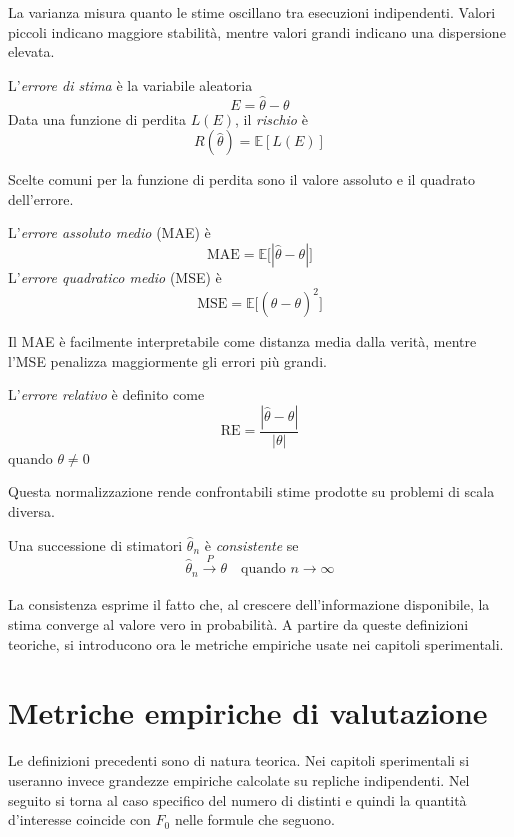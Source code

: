 La varianza misura quanto le stime oscillano tra esecuzioni indipendenti.
Valori piccoli indicano maggiore stabilità, mentre valori grandi indicano una dispersione elevata.

\begin{definition}
L'\emph{errore di stima} è la variabile aleatoria
\[
E = \hat{\theta} - \theta
\]
Data una funzione di perdita $L(E)$, il \emph{rischio} è
\[
R(\hat{\theta}) = \mathbb{E}[L(E)]
\]
\end{definition}

Scelte comuni per la funzione di perdita sono il valore assoluto e il quadrato dell'errore.

\begin{definition}
L'\emph{errore assoluto medio} (MAE) è
\[
\mathrm{MAE} = \mathbb{E}\bigl[|\hat{\theta}-\theta|\bigr]
\]
L'\emph{errore quadratico medio} (MSE) è
\[
\mathrm{MSE} = \mathbb{E}\bigl[(\hat{\theta}-\theta)^2\bigr]
\]
\end{definition}

Il MAE è facilmente interpretabile come distanza media dalla verità, mentre l'MSE penalizza maggiormente gli errori più grandi.

\begin{definition}
L'\emph{errore relativo} è definito come
\[
\mathrm{RE} = \frac{|\hat{\theta}-\theta|}{|\theta|}
\]
quando $\theta \neq 0$
\end{definition}

Questa normalizzazione rende confrontabili stime prodotte su problemi di scala diversa.

\begin{definition}[Consistenza]
Una successione di stimatori $\hat{\theta}_n$ è \emph{consistente} se
\[
\hat{\theta}_n \xrightarrow[]{P} \theta
\quad \text{quando } n \to \infty
\]
\end{definition}

La consistenza esprime il fatto che, al crescere dell'informazione disponibile,
la stima converge al valore vero in probabilità. A partire da queste definizioni teoriche,
si introducono ora le metriche empiriche usate nei capitoli sperimentali.

\section{Metriche empiriche di valutazione}
Le definizioni precedenti sono di natura teorica. Nei capitoli sperimentali si useranno invece grandezze empiriche
calcolate su repliche indipendenti. Nel seguito si torna al caso specifico del numero di distinti
e quindi la quantità d'interesse coincide con $F_0$ nelle formule che seguono.

